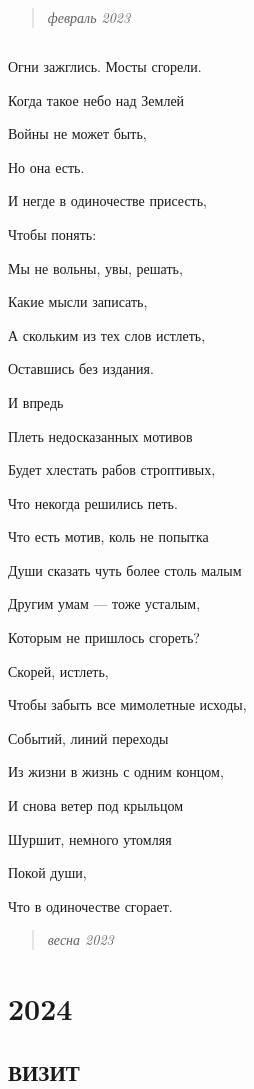 \documentclass[
  a5paperpaper,
  DIV=11,
  numbers=noendperiod]{scrreprt}
\begin{document}
\begin{quote}
\emph{февраль 2023}
\end{quote}

\section{}\label{section-18}

Огни зажглись. Мосты сгорели.

Когда такое небо над Землей

Войны не может быть,

Но она есть.

И негде в одиночестве присесть,

Чтобы понять:

Мы не вольны, увы, решать,

Какие мысли записать,

А скольким из тех слов истлеть,

Оставшись без издания.

И впредь

Плеть недосказанных мотивов

Будет хлестать рабов строптивых,

Что некогда решились петь.

Что есть мотив, коль не попытка

Души сказать чуть более столь малым

Другим умам --- тоже усталым,

Которым не пришлось сгореть?

Скорей, истлеть,

Чтобы забыть все мимолетные исходы,

Событий, линий переходы

Из жизни в жизнь с одним концом,

И снова ветер под крыльцом

Шуршит, немного утомляя

Покой души,

Что в одиночестве сгорает.

\begin{quote}
\emph{весна 2023}
\end{quote}


\chapter{2024}\label{section-19}

\section{ВИЗИТ}\label{ux432ux438ux437ux438ux442}
\end{document}
